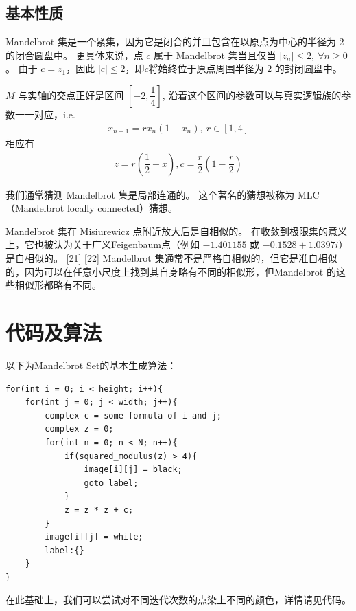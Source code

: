 \documentclass[UTF8]{ctexart}
\begin{document}
\subsection{基本性质}
Mandelbrot 集是一个紧集，因为它是闭合的并且包含在以原点为中心的半径为 2 的闭合圆盘中。 
更具体来说，点 $c$ 属于 Mandelbrot 集当且仅当 $\vert z_{n}\vert\leq 2,\  \forall n\geq 0$。 
由于 $c = z_1$，因此 $\vert c\vert\leq 2$，即$c$将始终位于原点周围半径为 $2$ 的封闭圆盘中。


$M$ 与实轴的交点正好是区间 $[-2,\dfrac1{ 4}]$, 沿着这个区间的参数可以与真实逻辑族的参数一一对应，i.e.\begin{align}
x_{n+1} = rx_n(1-x_n), \ r\in[1,4] \end{align}
相应有\begin{align}
z = r(\dfrac12 - x), c = \dfrac{r}2 (1-\dfrac{r}2)
\end{align}


我们通常猜测 Mandelbrot 集是局部连通的。 这个著名的猜想被称为 MLC（Mandelbrot locally connected）猜想。


Mandelbrot 集在 Misiurewicz 点附近放大后是自相似的。 
在收敛到极限集的意义上，它也被认为关于广义Feigenbaum点（例如 $-1.401155$ 或 $-0.1528 + 1.0397i$）是自相似的。 [21] [22] 
Mandelbrot 集通常不是严格自相似的，但它是准自相似的，因为可以在任意小尺度上找到其自身略有不同的相似形，但Mandelbrot 的这些相似形都略有不同。
\section{代码及算法}
以下为Mandelbrot Set的基本生成算法：
\begin{lstlisting}
for(int i = 0; i < height; i++){
	for(int j = 0; j < width; j++){
		complex c = some formula of i and j;
		complex z = 0;
		for(int n = 0; n < N; n++){
			if(squared_modulus(z) > 4){
				image[i][j] = black;
				goto label;
			}
			z = z * z + c;
		}
		image[i][j] = white;
		label:{}
	}
}
\end{lstlisting}
在此基础上，我们可以尝试对不同迭代次数的点染上不同的颜色，详情请见代码。
\end{document}
